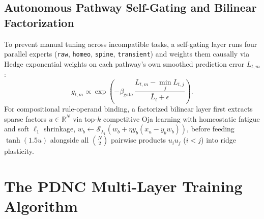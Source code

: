 \documentclass[11pt,a4paper]{article}
\begin{document}
\noindent{}

\subsection{Autonomous Pathway Self-Gating and Bilinear Factorization}
To prevent manual tuning across incompatible tasks, a self-gating layer runs four parallel experts (\texttt{raw}, \texttt{homeo}, \texttt{spine}, \texttt{transient}) and weights them causally via Hedge exponential weights on each pathway's own smoothed prediction error $L_{t,m}$:
\begin{equation}
g_{t,m} \propto \exp\!\left(-\beta_{\text{gate}}\,\frac{L_{t,m} - \min_j L_{t,j}}{\bar{L}_t + \epsilon}\right).
\end{equation}
For compositional rule-operand binding, a factorized bilinear layer first extracts sparse factors $u \in \mathbb{R}^N$ via top-$k$ competitive Oja learning with homeostatic fatigue and soft $\ell_1$ shrinkage, $w_b \leftarrow \mathcal{S}_{\lambda_1}(w_b + \eta y_b(x_u - y_b w_b))$, before feeding $\tanh(1.5 u)$ alongside all $\binom{N}{2}$ pairwise products $u_i u_j$ ($i < j$) into ridge plasticity.

\section{The PDNC Multi-Layer Training Algorithm}
\end{document}
